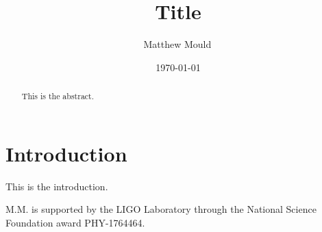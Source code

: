 \documentclass[
aps,
prd,
reprint,
groupedaddress,
linenumbers,
nolongbibliography,
nobibnotes,
nofootinbib,
eprint,
floats,
amssymb,
amsmath,
]{revtex4-2}
\begin{document}
\title{Title}

\author{Matthew Mould\,}
\ligo\mki\mit

\date{\today}

\begin{abstract}
This is the abstract.
\end{abstract}

\maketitle


\section{Introduction}

This is the introduction.


\acknowledgments

M.M. is supported by the LIGO Laboratory through the National Science Foundation award PHY-1764464.



\end{document}
